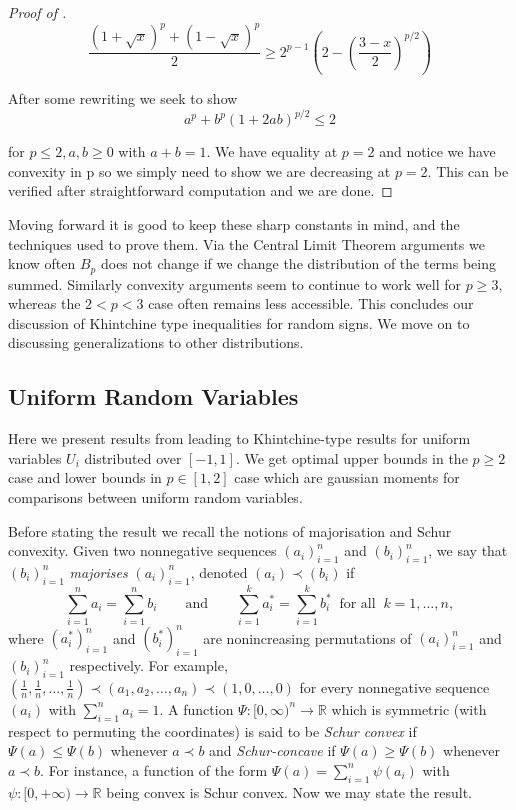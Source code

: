 \documentclass[10pt]{article}
\newcommand{\1}{\textbf{1}}
\newcommand{\R}{\mathbb{R}}
\theoremstyle{remark}
\theoremstyle{definition}
\begin{document}
\begin{proof}[Proof of \cite{NP}]
	\begin{equation*}
		\frac{(1+\sqrt{x})^p + (1-\sqrt{x})^p}{2} \geq 2^{p-1}(2-(\frac{3-x}{2})^{p/2})
	\end{equation*}

	After some rewriting we seek to show
	\begin{equation*}
		a^p + b^p (1+2ab)^{p/2} \leq 2
	\end{equation*}

	for $p \leq 2, a,b \geq 0$ with $a+b = 1$. We have equality at $p=2$ and notice we have convexity in p so we simply need to show  we are decreasing at $p=2$. This can be verified after straightforward computation and we are done.
\end{proof}

Moving forward it is good to keep these sharp constants in mind, and the techniques used to prove them. Via the Central Limit Theorem arguments we know often $B_p$ does not change if we change the distribution of the terms being summed. Similarly convexity arguments seem to continue to work well for $p \geq 3$, whereas the $2 < p < 3$ case often remains less accessible. This concludes our discussion of Khintchine type inequalities for random signs. We move on to discussing generalizations to other distributions.

\subsection{Uniform Random Variables}

Here we present results from \cite{LO} leading to Khintchine-type results for uniform variables $U_i$ distributed over $[-1,1]$. We get optimal upper bounds in the $p \geq 2$ case and lower bounds in $p \in [1,2]$ case which are gaussian moments for comparisons between uniform random variables. 

Before stating the result we recall the notions of majorisation and Schur convexity. Given two nonnegative sequences $(a_i)_{i=1}^n$ and $(b_i)_{i=1}^n$, we say that $(b_i)_{i=1}^n$ \emph{majorises} $(a_i)_{i=1}^n$, denoted $(a_i) \prec (b_i)$ if
\[
\sum_{i=1}^n a_i = \sum_{i=1}^n b_i \qquad \text{and} \qquad \sum_{i=1}^k a_i^* = \sum_{i=1}^k b_i^* \ \text{ for all } \ k = 1,\ldots,n,
\]
where $(a_i^*)_{i=1}^n$ and $(b_i^*)_{i=1}^n$ are nonincreasing permutations of $(a_i)_{i=1}^n$ and $(b_i)_{i=1}^n$ respectively. For example, $(\frac{1}{n},\frac{1}{n},\dots,\frac{1}{n}) \prec (a_1,a_2,\dots,a_n) \prec (1,0,\dots,0)$ for every nonnegative sequence $(a_i)$ with $\sum_{i=1}^n a_i = 1$. A function $\Psi\colon [0,\infty)^n \to \R$ which is symmetric (with respect to permuting the coordinates) is said to be \emph{Schur convex} if $\Psi(a) \leq \Psi(b)$ whenever $a \prec b$ and \emph{Schur-concave} if $\Psi(a) \geq \Psi(b)$ whenever $a \prec b$. For instance, a function of the form $\Psi(a) = \sum_{i=1}^n \psi(a_i)$ with $\psi\colon [0,+\infty) \to \R$ being convex is Schur convex. Now we may state the result.
\end{document}
